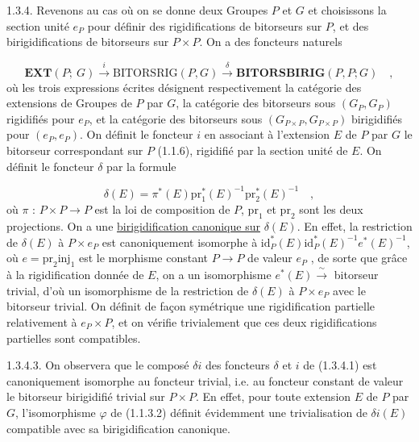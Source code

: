 1.3.4.  Revenons au cas où on se donne deux Groupes $P$ et $G$  et choisissons la section unité $e_P$ pour définir des rigidifications de bitorseurs sur $P$, et des birigidifications de bitorseurs sur $P\times P$. On a des foncteurs naturels

\begin{equation}\tag{1.3.4.1}
\mathbf{EXT}(P;\ G) \xrightarrow{\ i\ } \mathrm{BITORSRIG}(P,G) \xrightarrow{\ \delta\ } \mathbf{BITORSBIRIG}(P,P;G) \quad ,
\end{equation}
où les trois expressions écrites désignent respectivement la catégorie des extensions de Groupes de $P$ par $G$, la catégorie des bitorseurs sous $(G_P,G_P)$ rigidifiés pour $e_P$, et la catégorie des bitorseurs sous $(G_{P\times P},G_{P\times P})$ birigidifiés pour $(e_P,e_P)$. On définit le foncteur $i$ en associant à l'extension $E$ de $P$ par $G$ le bitorseur correspondant sur $P$ (1.1.6), rigidifié par la section unité de $E$. On définit le foncteur $\delta$ par la formule

\begin{equation}\tag{1.3.4.2}
\delta(E) = \pi^*(E)\mathrm{pr}_1^*(E)^{-1}\mathrm{pr}_2^*(E)^{-1} \quad ,
\end{equation}
où $\pi$ : $P\times P \longrightarrow P$ est la loi de composition de $P$, $\mathrm{pr}_1$ et $\mathrm{pr}_2$ sont les deux projections. On a une \underline{birigidification canonique sur} $\delta(E)$. En effet, la restriction de $\delta(E)$ à $P\times e_P$ est canoniquement isomorphe à $\mathrm{id}_P^*(E)\mathrm{id}_P^*(E)^{-1}e^*(E)^{-1}$, où $e = \mathrm{pr}_2\mathrm{inj}_1$ est le morphisme constant $P \longrightarrow P$ de valeur $e_P$ , de sorte que grâce à la rigidification donnée de $E$, on a un isomorphisme $e^*(E) \xrightarrow{\ \sim\ }$ bitorseur trivial, d'où un isomorphisme de la restriction de $\delta(E)$ à $P\times e_P$ avec le bitorseur trivial. On définit de façon symétrique une rigidification partielle relativement à $e_P\times P$, et on vérifie trivialement que ces deux rigidifications partielles sont compatibles.



1.3.4.3.  On observera que le composé $\delta i$ des foncteurs $\delta$ et $i$ de (1.3.4.1) est canoniquement isomorphe au foncteur trivial, i.e. au foncteur constant de valeur le bitorseur birigidifié trivial sur $P\times P$. En effet, pour toute extension $E$ de $P$ par $G$, l'isomorphisme $\varphi$ de (1.1.3.2) définit évidemment une trivialisation de $\delta i(E)$ compatible avec sa birigidification canonique.

